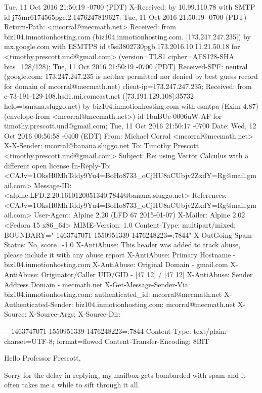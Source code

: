 \begin{itemize}
\begin{itemize}
        Tue, 11 Oct 2016 21:50:19 -0700 (PDT)
X-Received: by 10.99.110.78 with SMTP id j75mr6174565pgc.2.1476247819627;
        Tue, 11 Oct 2016 21:50:19 -0700 (PDT)
Return-Path: <mcorral@mecmath.net>
Received: from biz104.inmotionhosting.com (biz104.inmotionhosting.com. [173.247.247.235])
        by mx.google.com with ESMTPS id t5si3802730pgb.173.2016.10.11.21.50.18
        for <timothy.prescott.und@gmail.com>
        (version=TLS1 cipher=AES128-SHA bits=128/128);
        Tue, 11 Oct 2016 21:50:19 -0700 (PDT)
Received-SPF: neutral (google.com: 173.247.247.235 is neither permitted nor denied by best guess record for domain of mcorral@mecmath.net) client-ip=173.247.247.235;
Received: from c-73-191-129-108.hsd1.mi.comcast.net ([73.191.129.108]:35732 helo=banana.sluggo.net) by biz104.inmotionhosting.com with esmtpa (Exim 4.87) (envelope-from <mcorral@mecmath.net>) id 1buBUe-0006uW-AF for timothy.prescott.und@gmail.com; Tue, 11 Oct 2016 21:50:17 -0700
Date: Wed, 12 Oct 2016 00:56:58 -0400 (EDT)
From: Michael Corral <mcorral@mecmath.net>
X-X-Sender: mcorral@banana.sluggo.net
To: Timothy Prescott <timothy.prescott.und@gmail.com>
Subject: Re: using Vector Calculus with a different open license
In-Reply-To: <CAJv=1OksH0MhTddy9Yu4=BoHo8733_oCjHU8aCUbjv2ZxdY=Rg@mail.gmail.com>
Message-ID: <alpine.LFD.2.20.1610120051340.7844@banana.sluggo.net>
References: <CAJv=1OksH0MhTddy9Yu4=BoHo8733_oCjHU8aCUbjv2ZxdY=Rg@mail.gmail.com>
User-Agent: Alpine 2.20 (LFD 67 2015-01-07)
X-Mailer: Alpine 2.02 <Fedora 15 x86_64>
MIME-Version: 1.0
Content-Type: multipart/mixed; BOUNDARY="-1463747071-1550951339-1476248223=:7844"
X-OutGoing-Spam-Status: No, score=-1.0
X-AntiAbuse: This header was added to track abuse, please include it with any abuse report
X-AntiAbuse: Primary Hostname - biz104.inmotionhosting.com
X-AntiAbuse: Original Domain - gmail.com
X-AntiAbuse: Originator/Caller UID/GID - [47 12] / [47 12]
X-AntiAbuse: Sender Address Domain - mecmath.net
X-Get-Message-Sender-Via: biz104.inmotionhosting.com: authenticated_id: mcorral@mecmath.net
X-Authenticated-Sender: biz104.inmotionhosting.com: mcorral@mecmath.net
X-Source: 
X-Source-Args: 
X-Source-Dir: 

---1463747071-1550951339-1476248223=:7844
Content-Type: text/plain; charset=UTF-8; format=flowed
Content-Transfer-Encoding: 8BIT

Hello Professor Prescott,

Sorry for the delay in replying, my mailbox gets bombarded with
spam and it often takes me a while to sift through it all.


\end{itemize}
\end{itemize}
